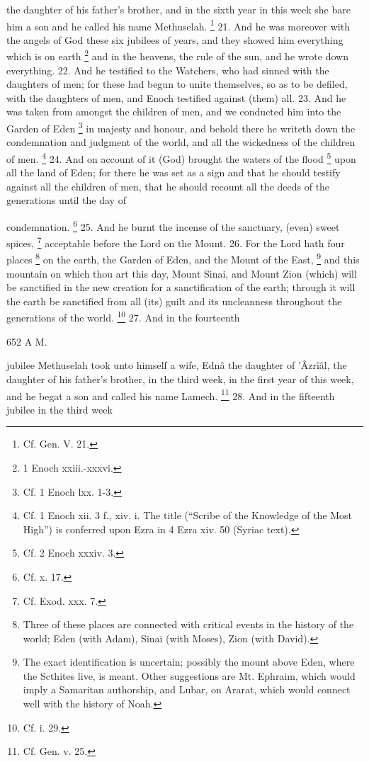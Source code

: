the daughter of his father's brother, and in the sixth year in this week she bare him a son and he called his name Methuselah. \footnote{Cf. Gen. V. 21.} 21. And he was moreover with the angels of God these six jubilees of years, and they showed him everything which is on earth \footnote{1 Enoch xxiii.-xxxvi.} and in the heavens, the rule of the sun, and he wrote down everything. 22. And he testified to the Watchers, who had sinned with the daughters of men; for these had begun to unite themselves, so as to be defiled, with the daughters of men, and Enoch testified against (them) all. 23. And he was taken from amongst the children of men, and we conducted him into the Garden of Eden \footnote{Cf. 1 Enoch lxx. 1-3.} in majesty and honour, and behold there he writeth down the condemnation and judgment of the world, and all the wickedness of the children of men. \footnote{Cf. 1 Enoch xii. 3 f., xiv. i. The title (``Scribe of the Knowledge of the Most High'') is conferred upon Ezra in 4 Ezra xiv. 50 (Syriac text).} 24. And on account of it (God) brought the waters of the flood \footnote{Cf. 2 Enoch xxxiv. 3.} upon all the land of Eden; for there he was set as a sign and that he should testify against all the children of men, that he should recount all the deeds of the generations until the day of

condemnation. \footnote{Cf. x. 17.} 25. And he burnt the incense of the sanctuary, (even) sweet spices, \footnote{Cf. Exod. xxx. 7.} acceptable before the Lord on the Mount. 26. For the Lord hath four places \footnote{Three of these places are connected with critical events in the history of the world; Eden (with Adam), Sinai (with Moses), Zion (with David).} on the earth, the Garden of Eden, and the Mount of the East, \footnote{The exact identification is uncertain; possibly the mount above Eden, where the Scthites live, is meant. Other suggestions are Mt. Ephraim, which would imply a Samaritan authorship, and Lubar, on Ararat, which would connect well with the history of Noah.} and this mountain on which thou art this day, Mount Sinai, and Mount Zion (which) will be sanctified in the new creation for a sanctification of the earth; through it will the earth be sanctified from all (its) guilt and its uncleanness throughout the generations of the world. \footnote{Cf. i. 29.} 27. And in the fourteenth

652 A M.

jubilee Methuselah took unto himself a wife, Ednâ the daughter of ’Âzrîâl, the daughter of his father's brother, in the third week, in the first year of this week, and he begat a son and called his name Lamech. \footnote{Cf. Gen. v. 25.} 28. And in the fifteenth jubilee in the third week

